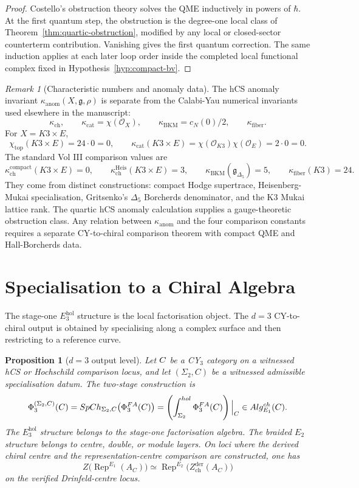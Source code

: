 \documentclass[11pt]{article}
\providecommand{\fg}{\mathfrak{g}}
\providecommand{\Rep}{\operatorname{Rep}}
\providecommand{\Alg}{\operatorname{Alg}}
\providecommand{\cO}{\mathcal{O}}
\providecommand{\Eone}{E_1}
\providecommand{\Etwo}{E_2}
\providecommand{\PhiFA}{\Phi^{\mathrm{FA}}}
\providecommand{\SpCh}{\operatorname{SpCh}}
\providecommand{\Zchder}{Z^{\mathrm{der}}_{\mathrm{ch}}}
\providecommand{\kanom}{\kappa_{\mathrm{anom}}}
\providecommand{\kch}{\kappa_{\mathrm{ch}}}
\providecommand{\kcat}{\kappa_{\mathrm{cat}}}
\providecommand{\kBKM}{\kappa_{\mathrm{BKM}}}
\providecommand{\kfib}{\kappa_{\mathrm{fiber}}}
\theoremstyle{plain}
\newtheorem{proposition}[theorem]{Proposition}
\theoremstyle{definition}
\theoremstyle{remark}
\newtheorem{remark}[theorem]{Remark}
\begin{document}
\begin{proof}
Costello's obstruction theory solves the QME inductively in powers of
\(\hbar\). At the first quantum step, the obstruction is the
degree-one local class of Theorem~\ref{thm:quartic-obstruction},
modified by any local or closed-sector counterterm contribution.
Vanishing gives the first quantum correction. The same induction
applies at each later loop order inside the completed local functional
complex fixed in Hypothesis~\ref{hyp:compact-bv}.
\end{proof}

\begin{remark}[Characteristic numbers and anomaly data]
\label{rem:characteristic-numbers}
The hCS anomaly invariant \(\kanom(X,\fg,\rho)\) is separate from the
Calabi-Yau numerical invariants used elsewhere in the manuscript:
\[
  \kch,\qquad
  \kcat=\chi(\cO_X),\qquad
  \kBKM=c_N(0)/2,\qquad
  \kfib.
\]
For \(X=K3\times E\),
\[
  \chi_{\mathrm{top}}(K3\times E)=24\cdot0=0,
  \qquad
  \kcat(K3\times E)=\chi(\cO_{K3})\chi(\cO_E)=2\cdot0=0.
\]
The standard Vol III comparison values are
\[
  \kch^{\mathrm{compact}}(K3\times E)=0,\qquad
  \kch^{\mathrm{Heis}}(K3\times E)=3,\qquad
  \kBKM(\mathfrak g_{\Delta_5})=5,\qquad
  \kfib(K3)=24.
\]
They come from distinct constructions: compact Hodge supertrace,
Heisenberg-Mukai specialisation, Gritsenko's \(\Delta_5\) Borcherds
denominator, and the K3 Mukai lattice rank. The quartic hCS anomaly
calculation supplies a gauge-theoretic obstruction class. Any relation
between \(\kanom\) and the four comparison constants requires a
separate CY-to-chiral comparison theorem with compact QME and
Hall-Borcherds data.
\end{remark}

\section{Specialisation to a Chiral Algebra}
\label{sec:phi-specialisation}

The stage-one \(E_3^{\mathrm{hol}}\) structure is the local
factorisation object. The \(d=3\) CY-to-chiral output is obtained by
specialising along a complex surface and then restricting to a
reference curve.

\begin{proposition}[\(d=3\) output level]
\label{prop:d3-output}
Let \(C\) be a CY\(_3\) category on a witnessed hCS or Hochschild
comparison locus, and let \((\Sigma_2,C)\) be a witnessed admissible
specialisation datum. The two-stage construction is
\[
  \Phi_3^{(\Sigma_2,C)}(\cC)
  =
  \SpCh_{\Sigma_2,C}\bigl(\PhiFA_3(\cC)\bigr)
  =
  \left(\int_{\Sigma_2}^{\mathrm{hol}}\PhiFA_3(\cC)\right)\Big|_C
  \in
  \Alg^{\mathrm{ch}}_{\Eone}(C).
\]
The \(E_3^{\mathrm{hol}}\) structure belongs to the stage-one
factorisation algebra. The braided \(E_2\) structure belongs to centre,
double, or module layers. On loci where the derived chiral centre and
the representation-centre comparison are constructed, one has
\[
  Z\bigl(\Rep^{\Eone}(A_C)\bigr)
  \simeq
  \Rep^{\Etwo}\bigl(\Zchder(A_C)\bigr)
\]
on the verified Drinfeld-centre locus.
\end{proposition}
\end{document}
